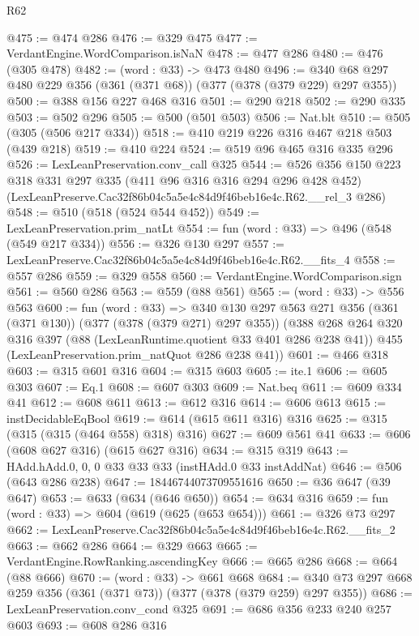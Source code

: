 \begin{lexlean}{R62}
\begin{coremodule}
@475 := @474 @286
@476 := @329 @475
@477 := VerdantEngine.WordComparison.isNaN
@478 := @477 @286
@480 := @476 (@305 @478)
@482 := (word : @33) -> @473 @480
@496 := @340 @68 @297 @480 @229 @356 (@361 (@371 @68)) (@377 (@378 (@379 @229) @297 @355))
@500 := @388 @156 @227 @468 @316
@501 := @290 @218
@502 := @290 @335
@503 := @502 @296
@505 := @500 (@501 @503)
@506 := Nat.blt
@510 := @505 (@305 (@506 @217 @334))
@518 := @410 @219 @226 @316 @467 @218 @503 (@439 @218)
@519 := @410 @224
@524 := @519 @96 @465 @316 @335 @296
@526 := LexLeanPreservation.conv_call @325
@544 := @526
    @356
    @150
    @223
    @318
    @331
    @297
    @335
    (@411 @96 @316 @316 @294 @296 @428 @452)
    (LexLeanPreserve.Cac32f86b04c5a5e4c84d9f46beb16e4c.R62.__rel_3 @286)
@548 := @510 (@518 (@524 @544 @452))
@549 := LexLeanPreservation.prim_natLt
@554 := fun (word : @33) => @496 (@548 (@549 @217 @334))
@556 := @326 @130 @297
@557 := LexLeanPreserve.Cac32f86b04c5a5e4c84d9f46beb16e4c.R62.__fits_4
@558 := @557 @286
@559 := @329 @558
@560 := VerdantEngine.WordComparison.sign
@561 := @560 @286
@563 := @559 (@88 @561)
@565 := (word : @33) -> @556 @563
@600 := fun (word : @33) =>
  @340
    @130
    @297
    @563
    @271
    @356
    (@361 (@371 @130))
    (@377 (@378 (@379 @271) @297 @355))
    (@388
      @268
      @264
      @320
      @316
      @397
      (@88 (LexLeanRuntime.quotient @33 @401 @286 @238 @41))
      @455
      (LexLeanPreservation.prim_natQuot @286 @238 @41))
@601 := @466 @318
@603 := @315 @601 @316
@604 := @315 @603
@605 := ite.{1}
@606 := @605 @303
@607 := Eq.{1}
@608 := @607 @303
@609 := Nat.beq
@611 := @609 @334 @41
@612 := @608 @611
@613 := @612 @316
@614 := @606 @613
@615 := instDecidableEqBool
@619 := @614 (@615 @611 @316) @316
@625 := @315 (@315 (@315 (@464 @558) @318) @316)
@627 := @609 @561 @41
@633 := @606 (@608 @627 @316) (@615 @627 @316)
@634 := @315 @319
@643 := HAdd.hAdd.{0, 0, 0} @33 @33 @33 (instHAdd.{0} @33 instAddNat)
@646 := @506 (@643 @286 @238)
@647 := 18446744073709551616
@650 := @36 @647 (@39 @647)
@653 := @633 (@634 (@646 @650))
@654 := @634 @316
@659 := fun (word : @33) => @604 (@619 (@625 (@653 @654)))
@661 := @326 @73 @297
@662 := LexLeanPreserve.Cac32f86b04c5a5e4c84d9f46beb16e4c.R62.__fits_2
@663 := @662 @286
@664 := @329 @663
@665 := VerdantEngine.RowRanking.ascendingKey
@666 := @665 @286
@668 := @664 (@88 @666)
@670 := (word : @33) -> @661 @668
@684 := @340 @73 @297 @668 @259 @356 (@361 (@371 @73)) (@377 (@378 (@379 @259) @297 @355))
@686 := LexLeanPreservation.conv_cond @325
@691 := @686 @356 @233 @240 @257 @603
@693 := @608 @286 @316

\end{coremodule}
\end{lexlean}
